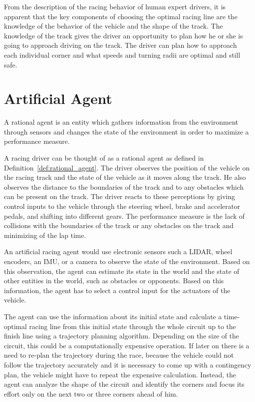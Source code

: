 From the description of the racing behavior of human expert drivers, it is apparent that the key components of choosing the optimal racing line are the knowledge of the behavior of the vehicle and the shape of the track. The knowledge of the track gives the driver an opportunity to plan how he or she is going to approach driving on the track. The driver can plan how to approach each individual corner and what speeds and turning radii are optimal and still safe.

\section{Artificial Agent}

\begin{defn}\label{def:rational_agent}
    A rational agent is an entity which gathers information from the environment through sensors and changes the state of the environment in order to maximize a performance measure.
\end{defn}

A racing driver can be thought of as a rational agent as defined in Definition~\ref{def:rational_agent}. The driver observes the position of the vehicle on the racing track and the state of the vehicle as it moves along the track. He also observes the distance to the boundaries of the track and to any obstacles which can be present on the track. The driver reacts to these perceptions by giving control inputs to the vehicle through the steering wheel, brake and accelerator pedals, and shifting into different gears. The performance measure is the lack of collisions with the boundaries of the track or any obstacles on the track and minimizing of the lap time.

An artificial racing agent would use electronic sensors such a LIDAR, wheel encoders, an \gls{IMU}, or a camera to observe the state of the environment. Based on this observation, the agent can estimate its state in the world and the state of other entities in the world, such as obstacles or opponents. Based on this information, the agent has to select a control input for the actuators of the vehicle.

The agent can use the information about its initial state and calculate a time-optimal racing line from this initial state through the whole circuit up to the finish line using a trajectory planning algorithm. Depending on the size of the circuit, this could be a computationally expensive operation. If later on there is a need to re-plan the trajectory during the race, because the vehicle could not follow the trajectory accurately and it is necessary to come up with a contingency plan, the vehicle might have to repeat the expensive calculation. Instead, the agent can analyze the shape of the circuit and identify the corners and focus its effort only on the next two or three corners ahead of him.

